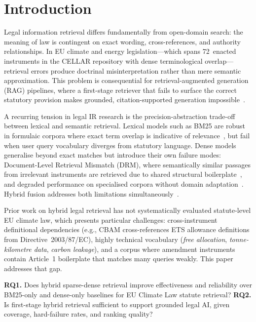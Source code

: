 \documentclass[conference]{IEEEtran}
\begin{document}
\IEEEpeerreviewmaketitle

\section{Introduction}

Legal information retrieval differs fundamentally from open-domain
search: the meaning of law is contingent on exact wording,
cross-references, and authority relationships.
In EU climate and energy legislation---which spans 72~enacted
instruments in the CELLAR repository with dense terminological
overlap---retrieval errors produce doctrinal misinterpretation rather
than mere semantic approximation.
This problem is consequential for retrieval-augmented generation (RAG)
pipelines, where a first-stage retriever that fails to surface the
correct statutory provision makes grounded, citation-supported
generation impossible~\cite{14}.

A recurring tension in legal IR research is the precision-abstraction
trade-off between lexical and semantic retrieval.
Lexical models such as BM25 are robust in formulaic corpora where
exact term overlap is indicative of relevance~\cite{1}, but fail when
user query vocabulary diverges from statutory language.
Dense models generalise beyond exact matches but introduce their own
failure modes: Document-Level Retrieval Mismatch (DRM), where
semantically similar passages from irrelevant instruments are retrieved
due to shared structural boilerplate~\cite{12}, and degraded
performance on specialised corpora without domain adaptation~\cite{14,16}.
Hybrid fusion addresses both limitations simultaneously~\cite{3}.

Prior work on hybrid legal retrieval has not systematically evaluated
statute-level EU climate law, which presents particular challenges:
cross-instrument definitional dependencies (e.g., CBAM cross-references
ETS allowance definitions from Directive~2003/87/EC), highly technical
vocabulary (\textit{free allocation}, \textit{tonne-kilometre data},
\textit{carbon leakage}), and a corpus where amendment instruments
contain Article~1 boilerplate that matches many queries weakly.
This paper addresses that gap.

\textbf{RQ1.} Does hybrid sparse-dense retrieval improve effectiveness
and reliability over BM25-only and dense-only baselines for EU Climate
Law statute retrieval?
\textbf{RQ2.} Is first-stage hybrid retrieval sufficient to support
grounded legal AI, given coverage, hard-failure rates, and ranking
quality?
\end{document}
